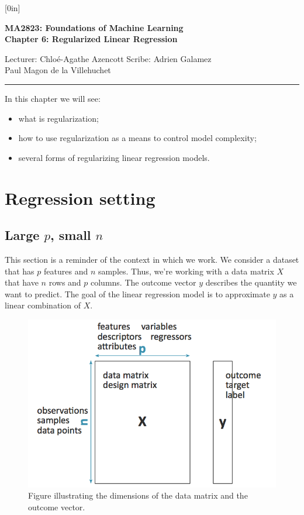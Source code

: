 \documentclass[a4paper,12pt]{article}
\begin{document}
\raisebox{0.6in}[0in]{}
\vspace{-0.7in}

\begin{center}
\bf\large MA2823: Foundations of Machine Learning \\
Chapter 6: Regularized Linear Regression
\end{center}

\noindent
Lecturer: Chlo\'e-Agathe Azencott   
\hfill
Scribe: Adrien Galamez \\
\null \hfill Paul Magon de la Villehuchet


\noindent
\rule{\textwidth}{1pt}

\medskip

In this chapter we will see:
\begin{itemize}
\item what is regularization;
\item how to use regularization as a means to control model complexity;
\item several forms of regularizing linear regression models.
\end{itemize}

\section{Regression setting}
\subsection{Large $p$, small $n$}
This section is a reminder of the context in which we work. We consider a dataset that has $p$ features and $n$ samples. Thus, we're working with a data matrix $X$ that have $n$ rows and $p$ columns. The outcome vector $y$ describes the quantity we want to predict. The goal of the linear regression model is to approximate $y$ as a linear combination of $X$.
\begin{figure}[!h]
\centerline{
\includegraphics[scale = 0.3]{figures/RegressionSettings.png}}
\caption{Figure illustrating the dimensions of the data matrix and the outcome vector.}
\label{DataMatrix}
\end{figure}
\end{document}
